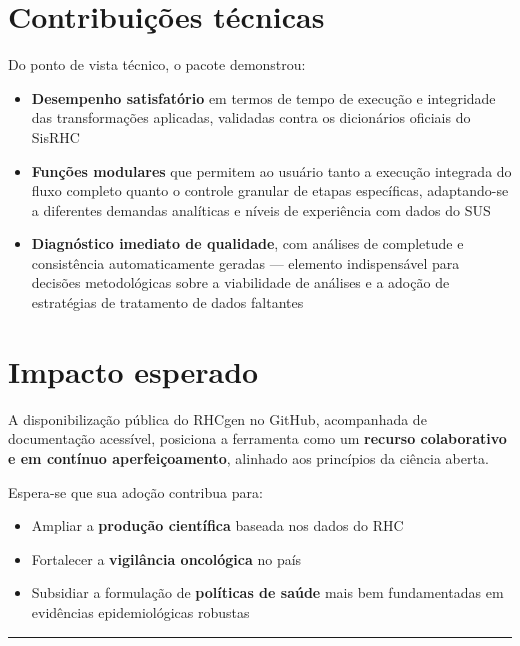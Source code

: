 \documentclass[
  brazilian,
  a4paper,
  oneside]{scrbook}
\providecommand{\tightlist}{%
  \setlength{\itemsep}{0pt}\setlength{\parskip}{0pt}}
\begin{document}
\section{Contribuições técnicas}\label{contribuiuxe7uxf5es-tuxe9cnicas}

Do ponto de vista técnico, o pacote demonstrou:

\begin{itemize}
\tightlist
\item
  \textbf{Desempenho satisfatório} em termos de tempo de execução e
  integridade das transformações aplicadas, validadas contra os
  dicionários oficiais do SisRHC
\item
  \textbf{Funções modulares} que permitem ao usuário tanto a execução
  integrada do fluxo completo quanto o controle granular de etapas
  específicas, adaptando-se a diferentes demandas analíticas e níveis de
  experiência com dados do SUS
\item
  \textbf{Diagnóstico imediato de qualidade}, com análises de completude
  e consistência automaticamente geradas --- elemento indispensável para
  decisões metodológicas sobre a viabilidade de análises e a adoção de
  estratégias de tratamento de dados faltantes
\end{itemize}

\section{Impacto esperado}\label{impacto-esperado}

A disponibilização pública do RHCgen no GitHub, acompanhada de
documentação acessível, posiciona a ferramenta como um \textbf{recurso
colaborativo e em contínuo aperfeiçoamento}, alinhado aos princípios da
ciência aberta.

Espera-se que sua adoção contribua para:

\begin{itemize}
\tightlist
\item
  Ampliar a \textbf{produção científica} baseada nos dados do RHC
\item
  Fortalecer a \textbf{vigilância oncológica} no país
\item
  Subsidiar a formulação de \textbf{políticas de saúde} mais bem
  fundamentadas em evidências epidemiológicas robustas
\end{itemize}

\begin{center}\rule{0.5\linewidth}{0.5pt}\end{center}
\end{document}
